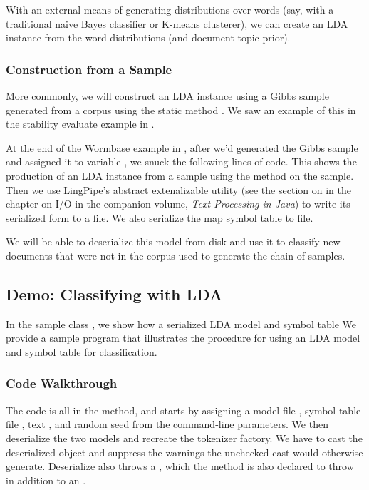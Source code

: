 With an external means of generating distributions over words (say,
with a traditional naive Bayes classifier or K-means clusterer), we
can create an LDA instance from the word distributions (and
document-topic prior).

\subsubsection{Construction from a Sample}

More commonly, we will construct an LDA instance using a Gibbs sample
generated from a corpus using the static method .
We saw an example of this in the stability evaluate example in
.  

At the end of the Wormbase example in , after we'd generated
the Gibbs sample and assigned it to variable , we snuck
the following lines of code.
%
%
This shows the production of an LDA instance from a sample using the
 method on the sample.  Then we use LingPipe's abstract
extenalizable utility (see the section on 
in the chapter on I/O in the companion volume, {\it Text Processing in Java})
to write its serialized form to a file.  We also serialize the map symbol
table to file.

We will be able to deserialize this model from disk and use it to
classify new documents that were not in the corpus used to generate
the chain of samples.

\subsection{Demo: Classifying with LDA}

In the sample class , we show how a serialized LDA
model and symbol table We provide a sample program that illustrates
the procedure for using an LDA model and symbol table for classification.

\subsubsection{Code Walkthrough}

The code is all in the  method, and starts by assigning a
model file , symbol table file ,
text , and random seed  from the
command-line parameters.  We then deserialize the two models and
recreate the tokenizer factory.
%
%
We have to cast the deserialized object and suppress the warnings the
unchecked cast would otherwise generate.  Deserialize also throws a
, which the  method is also
declared to throw in addition to an .


